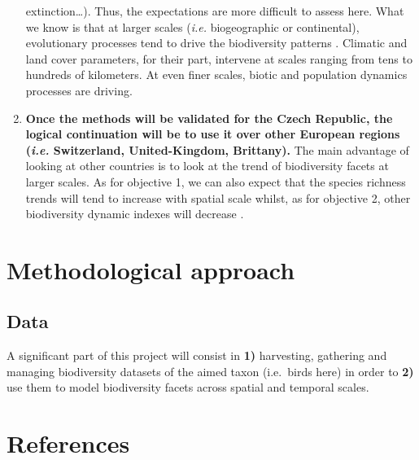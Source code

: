 \documentclass[
  12pt,
  oneside]{report}
\begin{document}
\begin{enumerate}
  extinction\ldots). Thus, the expectations are more difficult to assess here. What we know is that at
  larger scales (\emph{i.e.} biogeographic or continental), evolutionary processes tend to drive the
  biodiversity patterns \autocite{keil_downscaling_2014}. Climatic and land cover parameters, for their part,
  intervene at scales ranging from tens to hundreds of kilometers. At even finer scales, biotic
  and population dynamics processes are driving.
\item
  \textbf{Once the methods will be validated for the Czech Republic, the logical continuation will be to use it over other European regions (\textit{i.e.} Switzerland, United-Kingdom, Brittany).} The main advantage of looking at other countries is to look at the trend of
  biodiversity facets at larger scales. As for objective 1, we can also expect that the species
  richness trends will tend to increase with spatial scale \autocite{chase_species_2019} whilst, as for
  objective 2, other biodiversity dynamic indexes will decrease \autocite{jarzyna_spatial_2015}.
\end{enumerate}

\hypertarget{method}{%
\chapter{Methodological approach}\label{method}}

\hypertarget{data}{%
\section{Data}\label{data}}

A significant part of this project will consist in \textbf{1)} harvesting, gathering and managing biodiversity
datasets of the aimed taxon (i.e.~birds here) in order to \textbf{2)} use them to model biodiversity facets
across spatial and temporal scales.


\singlespacing %
\chapter{References}\label{references}
{
\renewcommand{\clearpage}{}
\printbibliography[heading=none] %
}
\end{document}
